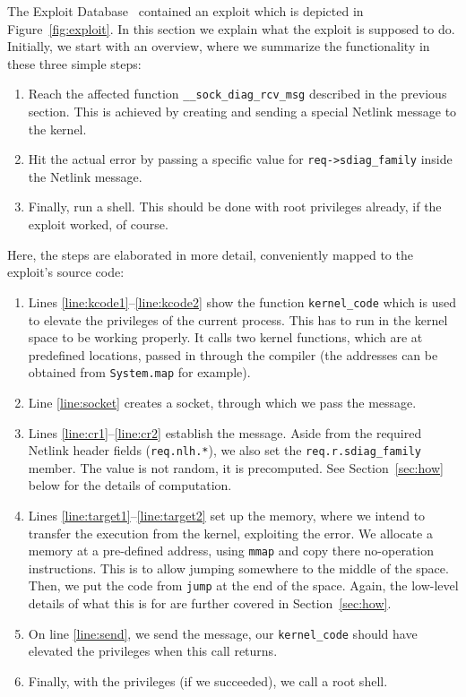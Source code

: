 \documentclass[10pt]{llncs}
\newcommand{\code}[2][]{\lstinline[columns=fullflexible, #1]$#2$}
\begin{document}
The Exploit Database~\cite{edb} contained an exploit which is depicted in
Figure~\ref{fig:exploit}. In this section we explain what the exploit is
supposed to do. Initially, we start with an overview, where we summarize the
functionality in these three simple steps:\afterpage{\clearpage}
\begin{enumerate}
\item Reach the affected function \code{__sock_diag_rcv_msg} described in the
previous section. This is achieved by creating and sending a special Netlink
message to the kernel.

\item Hit the actual error by passing a specific value for
\code{req->sdiag_family} inside the Netlink message.

\item Finally, run a shell. This should be done with root privileges already,
if the exploit worked, of course.
\end{enumerate}

Here, the steps are elaborated in more detail, conveniently mapped to the
exploit's source code:
\begin{enumerate}
\item Lines \ref{line:kcode1}--\ref{line:kcode2} show the function
\code{kernel_code} which is used to elevate the privileges of the current
process. This has to run in the kernel space to be working properly. It calls
two kernel functions, which are at predefined locations, passed in through the
compiler (the addresses can be obtained from \code{System.map} for example).

\item Line \ref{line:socket} creates a socket, through which we pass the
message.

\item Lines \ref{line:cr1}--\ref{line:cr2} establish the message. Aside from
the required Netlink header fields (\code{req.nlh.*}), we also set the
\code{req.r.sdiag_family} member. The value is not random, it is precomputed.
See Section~\ref{sec:how} below for the details of computation.

\item Lines \ref{line:target1}--\ref{line:target2} set up the memory, where we
intend to transfer the execution from the kernel, exploiting the error. We
allocate a memory at a pre-defined address, using \code{mmap} and copy there
no-operation instructions. This is to allow jumping somewhere to the middle of
the space. Then, we put the code from \code{jump} at the end of the space.
Again, the low-level details of what this is for are further covered in
Section~\ref{sec:how}.

\item On line \ref{line:send}, we send the message, our \code{kernel_code}
should have elevated the privileges when this call returns.

\item Finally, with the privileges (if we succeeded), we call a root shell.

\end{enumerate}
\end{document}
